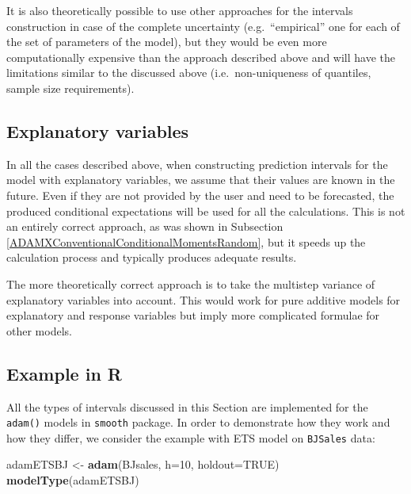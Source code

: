 \documentclass[]{book}
\newenvironment{Shaded}{\begin{snugshade}}{\end{snugshade}}
\newcommand{\DataTypeTok}[1]{\textcolor[rgb]{0.13,0.29,0.53}{#1}}
\newcommand{\DecValTok}[1]{\textcolor[rgb]{0.00,0.00,0.81}{#1}}
\newcommand{\KeywordTok}[1]{\textcolor[rgb]{0.13,0.29,0.53}{\textbf{#1}}}
\newcommand{\NormalTok}[1]{#1}
\newcommand{\OtherTok}[1]{\textcolor[rgb]{0.56,0.35,0.01}{#1}}
\newcommand{\StringTok}[1]{\textcolor[rgb]{0.31,0.60,0.02}{#1}}
\theoremstyle{definition}
\theoremstyle{definition}
\theoremstyle{definition}
\theoremstyle{definition}
\theoremstyle{remark}
\begin{document}
It is also theoretically possible to use other approaches for the intervals construction in case of the complete uncertainty (e.g.~``empirical'' one for each of the set of parameters of the model), but they would be even more computationally expensive than the approach described above and will have the limitations similar to the discussed above (i.e.~non-uniqueness of quantiles, sample size requirements).

\hypertarget{explanatory-variables-1}{%
\subsection{Explanatory variables}\label{explanatory-variables-1}}

In all the cases described above, when constructing prediction intervals for the model with explanatory variables, we assume that their values are known in the future. Even if they are not provided by the user and need to be forecasted, the produced conditional expectations will be used for all the calculations. This is not an entirely correct approach, as was shown in Subsection \ref{ADAMXConventionalConditionalMomentsRandom}, but it speeds up the calculation process and typically produces adequate results.

The more theoretically correct approach is to take the multistep variance of explanatory variables into account. This would work for pure additive models for explanatory and response variables but imply more complicated formulae for other models.

\hypertarget{ADAMForecastingPIExample}{%
\subsection{Example in R}\label{ADAMForecastingPIExample}}

All the types of intervals discussed in this Section are implemented for the \texttt{adam()} models in \texttt{smooth} package. In order to demonstrate how they work and how they differ, we consider the example with ETS model on \texttt{BJSales} data:

\begin{Shaded}
\begin{Highlighting}[]
\NormalTok{adamETSBJ <-}\StringTok{ }\KeywordTok{adam}\NormalTok{(BJsales, }\DataTypeTok{h=}\DecValTok{10}\NormalTok{, }\DataTypeTok{holdout=}\OtherTok{TRUE}\NormalTok{)}
\KeywordTok{modelType}\NormalTok{(adamETSBJ)}
\end{Highlighting}
\end{Shaded}
\end{document}
